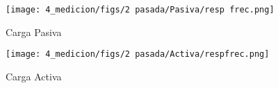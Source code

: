 

\begin{figure}[ht]
    \centering
    \texttt{[image: 4\_medicion/figs/2 pasada/Pasiva/resp frec.png]}
    \caption{Carga Pasiva}
    \label{fig:frec carga pasiva}
\end{figure}

\begin{figure}[ht]
    \centering
    \texttt{[image: 4\_medicion/figs/2 pasada/Activa/respfrec.png]}
    \caption{Carga Activa}
    \label{fig:frec carga activa}
\end{figure}